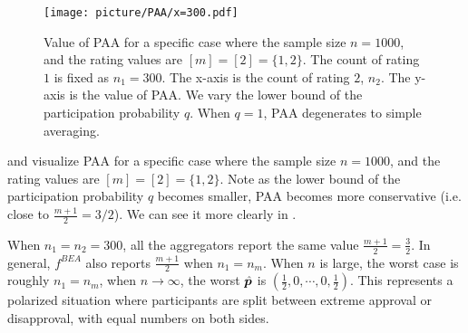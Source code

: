 \begin{figure}[h]
  \centering
  \texttt{[image: picture/PAA/x=300.pdf]}
  \caption{Value of PAA for a specific case where the sample size $n=1000$, and the rating values are \([m]=[2]=\{1, 2\}\). The count of rating $1$ is fixed as $n_1=300$. The x-axis is the count of rating $2$, $n_2$. The y-axis is the value of PAA. We vary the lower bound of the participation probability \( q \). When \( q = 1 \), PAA degenerates to simple averaging.}
  \label{fig:x=300}
\end{figure}

 and  visualize PAA for a specific case where the sample size $n=1000$, and the rating values are \([m]=[2]=\{1, 2\}\). Note as the lower bound of the participation probability $q$ becomes smaller, PAA becomes more conservative (i.e. close to $\frac{m+1}{2}=3/2$). We can see it more clearly in .

When $n_1=n_2=300$, all the aggregators report the same value $\frac{m+1}{2}=\frac{3}{2}$. In general, $f^{BEA}$ also reports $\frac{m+1}{2}$ when $n_1=n_m$. When $n$ is large, the worst case is roughly $n_1=n_m$, when $n \to \infty$, the worst $\hat{{\bm{p}}}$ is $(\frac{1}{2},0,\cdots,0,\frac{1}{2})$. This represents a polarized situation where participants are split between extreme approval or disapproval, with equal numbers on both sides. 









